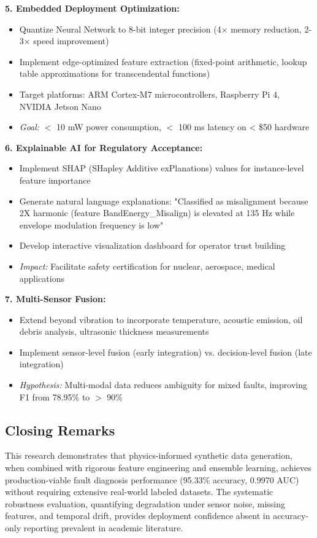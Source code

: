 \documentclass[11pt,a4paper]{article}
\begin{document}
\textbf{5. Embedded Deployment Optimization:}
\begin{itemize}[itemsep=0.3em]
    \item Quantize Neural Network to 8-bit integer precision (4× memory reduction, 2-3× speed improvement)
    \item Implement edge-optimized feature extraction (fixed-point arithmetic, lookup table approximations for transcendental functions)
    \item Target platforms: ARM Cortex-M7 microcontrollers, Raspberry Pi 4, NVIDIA Jetson Nano
    \item \textit{Goal:}  $<$ 10 mW power consumption,  $<$ 100 ms latency on $ $<$ $ \$50 hardware
\end{itemize}

\textbf{6. Explainable AI for Regulatory Acceptance:}
\begin{itemize}[itemsep=0.3em]
    \item Implement SHAP (SHapley Additive exPlanations) values for instance-level feature importance
    \item Generate natural language explanations: "Classified as misalignment because 2X harmonic (feature BandEnergy\_Misalign) is elevated at 135 Hz while envelope modulation frequency is low"
    \item Develop interactive visualization dashboard for operator trust building
    \item \textit{Impact:} Facilitate safety certification for nuclear, aerospace, medical applications
\end{itemize}

\textbf{7. Multi-Sensor Fusion:}
\begin{itemize}[itemsep=0.3em]
    \item Extend beyond vibration to incorporate temperature, acoustic emission, oil debris analysis, ultrasonic thickness measurements
    \item Implement sensor-level fusion (early integration) vs. decision-level fusion (late integration)
    \item \textit{Hypothesis:} Multi-modal data reduces ambiguity for mixed faults, improving F1 from 78.95\% to  $>$ 90\%
\end{itemize}

\subsection{Closing Remarks}

This research demonstrates that physics-informed synthetic data generation, when combined with rigorous feature engineering and ensemble learning, achieves production-viable fault diagnosis performance (95.33\% accuracy, 0.9970 AUC) without requiring extensive real-world labeled datasets. The systematic robustness evaluation, quantifying degradation under sensor noise, missing features, and temporal drift, provides deployment confidence absent in accuracy-only reporting prevalent in academic literature.
\end{document}
